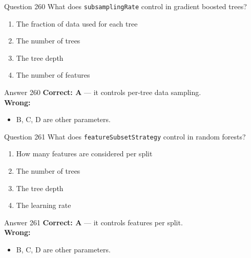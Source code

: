 \documentclass[aspectratio=169,11pt]{beamer}
\begin{document}
	\begin{frame}{Question 260}
		What does \texttt{subsamplingRate} control in gradient boosted trees?
		\begin{enumerate}[label=\Alph*.]
			\item The fraction of data used for each tree
			\item The number of trees
			\item The tree depth
			\item The number of features
		\end{enumerate}
	\end{frame}
	\begin{frame}{Answer 260}
		\textbf{Correct: A} --- it controls per-tree data sampling.\\
		\vspace{0.5em}
		\textbf{Wrong:}
		\begin{itemize}
			\item B, C, D are other parameters.
		\end{itemize}
	\end{frame}
	
	\begin{frame}{Question 261}
		What does \texttt{featureSubsetStrategy} control in random forests?
		\begin{enumerate}[label=\Alph*.]
			\item How many features are considered per split
			\item The number of trees
			\item The tree depth
			\item The learning rate
		\end{enumerate}
	\end{frame}
	\begin{frame}{Answer 261}
		\textbf{Correct: A} --- it controls features per split.\\
		\vspace{0.5em}
		\textbf{Wrong:}
		\begin{itemize}
			\item B, C, D are other parameters.
		\end{itemize}
	\end{frame}
	
\end{document}
